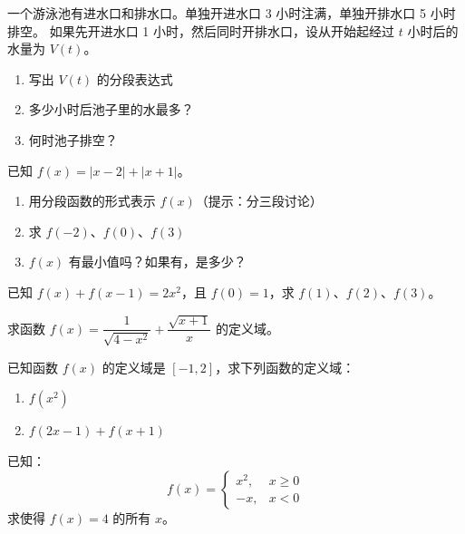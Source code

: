 \begin{exercise}[4]
一个游泳池有进水口和排水口。单独开进水口 3 小时注满，单独开排水口 5 小时排空。
如果先开进水口 1 小时，然后同时开排水口，设从开始起经过 \(t\) 小时后的水量为 \(V(t)\)。
\begin{enumerate}
  \item[(1)] 写出 \(V(t)\) 的分段表达式
  \item[(2)] 多少小时后池子里的水最多？
  \item[(3)] 何时池子排空？
\end{enumerate}
\end{exercise}

\begin{exercise}[4]
已知 \(f(x) = |x - 2| + |x + 1|\)。
\begin{enumerate}
  \item[(1)] 用分段函数的形式表示 \(f(x)\)（提示：分三段讨论）
  \item[(2)] 求 \(f(-2)\)、\(f(0)\)、\(f(3)\)
  \item[(3)] \(f(x)\) 有最小值吗？如果有，是多少？
\end{enumerate}
\end{exercise}

\begin{exercise}[4]
已知 \(f(x) + f(x - 1) = 2x^2\)，且 \(f(0) = 1\)，求 \(f(1)\)、\(f(2)\)、\(f(3)\)。
\end{exercise}


\begin{exercise}[5]
求函数 \(f(x) = \dfrac{1}{\sqrt{4 - x^2}} + \dfrac{\sqrt{x + 1}}{x}\) 的定义域。
\end{exercise}

\begin{exercise}[5]
已知函数 \(f(x)\) 的定义域是 \([-1, 2]\)，求下列函数的定义域：
\begin{enumerate}
  \item[(1)] \(f(x^2)\)
  \item[(2)] \(f(2x - 1) + f(x + 1)\)
\end{enumerate}
\end{exercise}

\begin{exercise}[5]
已知：
\[
f(x) =
\begin{cases}
x^2, & x \ge 0 \\
-x,  & x < 0
\end{cases}
\]
求使得 \(f(x) = 4\) 的所有 \(x\)。
\end{exercise}

